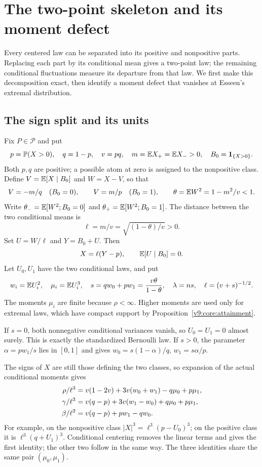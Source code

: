 \section{The two-point skeleton and its moment defect}
\label{ms:geometry-counts}

Every centered law can be separated into its positive and nonpositive
parts. Replacing each part by its conditional mean gives a two-point law;
the remaining conditional fluctuations measure its departure from that
law. We first make this decomposition exact, then identify a moment
defect that vanishes at Esseen's extremal distribution.

\subsection{The sign split and its units}

Fix $P\in\mathcal P$ and put
\[
 p=\mathbb P(X>0),\quad q=1-p,\quad v=pq,\quad
 m=\mathbb E X_+=\mathbb E X_->0,\quad B_0=\mathbf1_{\{X>0\}}.
\]
Both $p,q$ are positive; a possible atom at zero is assigned to the
nonpositive class. Define $V=\mathbb E[X\mid B_0]$ and $W=X-V$, so that
\[
 V=-m/q\quad(B_0=0),\qquad V=m/p\quad(B_0=1),\qquad
 \theta=\mathbb E W^2=1-m^2/v<1.
\]
Write $\theta_-=\mathbb E[W^2;B_0=0]$ and $\theta_+=\mathbb E[W^2;B_0=1]$.
The distance between the two conditional means is
\[
 \ell=m/v=\sqrt{(1-\theta)/v}>0.
\]
Set $U=W/\ell$ and $Y=B_0+U$. Then
\begin{equation}
 X=\ell(Y-p),\qquad \mathbb E[U\mid B_0]=0.
\label{ms:bernoulli-coordinates}
\end{equation}
Let $U_0,U_1$ have the two conditional laws, and put
\[
 w_i=\mathbb E U_i^2,\quad \mu_i=\mathbb E U_i^3,\quad
 s=qw_0+pw_1=\frac{v\theta}{1-\theta},\quad
 \lambda=ns,\quad \ell=(v+s)^{-1/2}.
\]
The moments $\mu_i$ are finite because $\rho<\infty$. Higher moments are
used only for extremal laws, which have compact support by
Proposition~\ref{v9:core:attainment}.

If $s=0$, both nonnegative conditional variances vanish, so $U_0=U_1=0$
almost surely. This is exactly the standardized Bernoulli law. If $s>0$,
the parameter $\alpha=pw_1/s$ lies in $[0,1]$ and gives
$w_0=s(1-\alpha)/q$, $w_1=s\alpha/p$.

The signs of $X$ are still those defining the two classes, so expansion
of the actual conditional moments gives
\begin{align}
 \rho/\ell^3&=v(1-2v)+3v(w_0+w_1)-q\mu_0+p\mu_1,\notag\\
 \gamma/\ell^3&=v(q-p)+3v(w_1-w_0)+q\mu_0+p\mu_1,\notag\\
 \beta/\ell^2&=v(q-p)+pw_1-qw_0.
\label{ms:conditional-moments}
\end{align}
For example, on the nonpositive class $|X|^3=\ell^3(p-U_0)^3$;
on the positive class it is $\ell^3(q+U_1)^3$. Conditional centering removes
the linear terms and gives the first identity; the other two follow in
the same way. The three identities share the same pair $(\mu_0,\mu_1)$.

